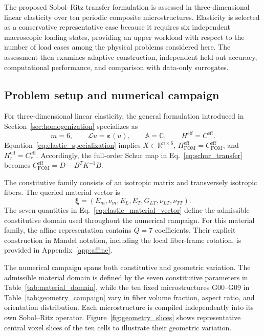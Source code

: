 \documentclass[pdflatex,sn-basic,Numbered]{sn-jnl}
\newcommand{\R}{\mathbb{R}}
\newcommand{\Heff}{H^{\mathrm{eff}}}
\newcommand{\Hr}{H^{\mathrm{eff}}_r}
\newcommand{\Hfom}{H^{\mathrm{eff}}_{\mathrm{FOM}}}
\newcommand{\Ceff}{C^{\mathrm{eff}}}
\newcommand{\Cr}{C^{\mathrm{eff}}_r}
\newcommand{\Cfom}{C^{\mathrm{eff}}_{\mathrm{FOM}}}
\begin{document}
The proposed Sobol--Ritz transfer formulation is assessed in
three-dimensional linear elasticity over ten periodic composite
microstructures. Elasticity is selected as a conservative representative case
because it requires six independent macroscopic loading states, providing an
upper workload with respect to the number of load cases among the physical
problems considered here. The assessment then examines adaptive construction,
independent held-out accuracy, computational performance, and comparison with
data-only surrogates.

\subsection{Problem setup and numerical campaign}
\label{subsec:elasticity_setup}

For three-dimensional linear elasticity, the general formulation introduced
in Section~\ref{sec:homogenization} specializes as
\begin{equation}
\label{eq:elastic_specialization}
m=6,
\qquad
\mathcal L u
=
\boldsymbol{\varepsilon}(u),
\qquad
\mathbb A
=
\mathbb C,
\qquad
\Heff
=
\Ceff.
\end{equation}
Equation~\eqref{eq:elastic_specialization} implies
\(X\in\R^{n\times6}\), \(\Hfom=\Cfom\), and \(\Hr=\Cr\). Accordingly, the
full-order Schur map in Eq.~\eqref{eq:schur_transfer} becomes
\(\Cfom=D-B^TK^{-1}B\).

The constitutive family consists of an isotropic matrix and transversely
isotropic fibers. The queried material vector is
\begin{equation}
\label{eq:elastic_material_vector}
\boldsymbol\xi
=
(E_m,\nu_m,E_L,E_T,G_{LT},\nu_{LT},\nu_{TT}).
\end{equation}
The seven quantities in Eq.~\eqref{eq:elastic_material_vector} define the
admissible constitutive domain used throughout the numerical campaign.
For this material family, the affine representation contains \(Q=7\)
coefficients. Their explicit construction in Mandel notation, including the
local fiber-frame rotation, is provided in Appendix~\ref{app:affine}.

The numerical campaign spans both constitutive and geometric variation. The
admissible material domain is defined by the seven constitutive parameters in
Table~\ref{tab:material_domain}, while the ten fixed microstructures G00--G09
in Table~\ref{tab:geometry_campaign} vary in fiber volume fraction, aspect
ratio, and orientation distribution. Each microstructure is compiled
independently into its own Sobol--Ritz operator. Figure~\ref{fig:geometry_slices}
shows representative central voxel slices of the ten cells to illustrate their
geometric variation.
\end{document}
